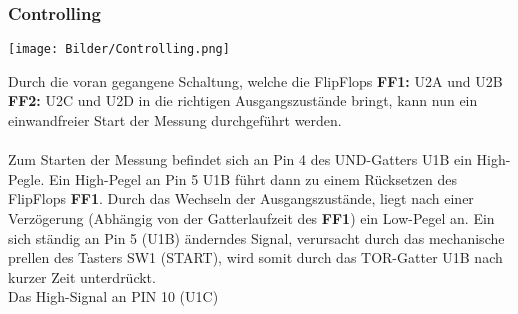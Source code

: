 \documentclass[a4paper,11pt]{scrartcl}
\begin{document}
\subsubsection{Controlling}

\begin{center}
\texttt{[image: Bilder/Controlling.png]}
\end{center}

Durch die voran gegangene Schaltung, welche die FlipFlops \textbf{FF1:} U2A und U2B \textbf{FF2:} U2C und U2D in die richtigen Ausgangszustände bringt, kann nun ein einwandfreier Start der Messung durchgeführt werden. 
\\
\\
Zum Starten der Messung befindet sich an Pin 4 des UND-Gatters U1B ein High-Pegle. Ein High-Pegel an Pin 5 U1B führt dann zu einem Rücksetzen des FlipFlops \textbf{FF1}. Durch das Wechseln der Ausgangszustände, liegt nach einer Verzögerung (Abhängig von der Gatterlaufzeit des \textbf{FF1}) ein Low-Pegel an. Ein sich ständig an Pin 5 (U1B) änderndes Signal, verursacht durch das mechanische prellen des Tasters SW1 (START), wird somit durch das TOR-Gatter U1B nach kurzer Zeit unterdrückt.
\\
Das High-Signal an PIN 10 (U1C) 
\end{document}
